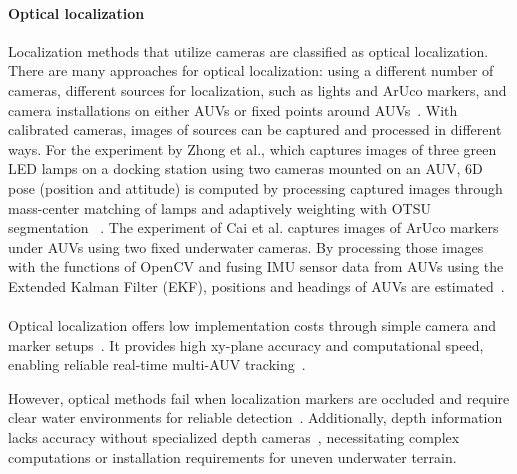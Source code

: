\documentclass[11pt]{article}
\begin{document}
        \paragraph{Optical localization}
        Localization methods that utilize cameras are classified as optical localization. There are many approaches for optical localization: using a different number of cameras, different sources for localization, such as lights and ArUco markers, and camera installations on either AUVs or fixed points around AUVs~\cite{cai_development_2024,zhong_fast_2019}. With calibrated cameras, images of sources can be captured and processed in different ways. For the experiment by Zhong et al., which captures images of three green LED lamps on a docking station using two cameras mounted on an AUV, 6D pose (position and attitude) is computed by processing captured images through mass-center matching of lamps and adaptively weighting with OTSU segmentation ~\cite{zhong_fast_2019}. The experiment of Cai et al. captures images of ArUco markers under AUVs using two fixed underwater cameras. By processing those images with the functions of OpenCV and fusing IMU sensor data from AUVs using the Extended Kalman Filter (EKF), positions and headings of AUVs are estimated~\cite{cai_development_2024}.\\\\
        Optical localization offers low implementation costs through simple camera and marker setups~\cite{cai_development_2024, zhong_fast_2019}. It provides high xy-plane accuracy and computational speed, enabling reliable real-time multi-AUV tracking~\cite{zhong_fast_2019}.

        However, optical methods fail when localization markers are occluded and require clear water environments for reliable detection~\cite{cai_development_2024,zhong_fast_2019}. Additionally, depth information lacks accuracy without specialized depth cameras~\cite{cai_development_2024}, necessitating complex computations or installation requirements for uneven underwater terrain.
\end{document}
